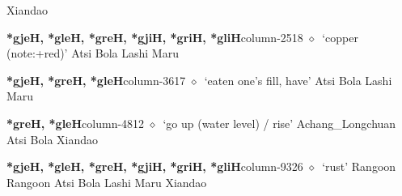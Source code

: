 \hspace{1ex}
         Xiandao 
  \item {\footnotesize \textbf{*gjeH, *gleH, *greH, *gjiH, *griH, *gliH}}{\tiny column-2518}
         $\diamond$~`copper (note:+red)'
         Atsi 
\hspace{1ex}
         Bola 
\hspace{1ex}
         Lashi 
\hspace{1ex}
         Maru 
  \item {\footnotesize \textbf{*gjeH, *greH, *gleH}}{\tiny column-3617}
         $\diamond$~`eaten one's fill, have'
         Atsi 
\hspace{1ex}
         Bola 
\hspace{1ex}
         Lashi 
\hspace{1ex}
         Maru 
  \item {\footnotesize \textbf{*greH, *gleH}}{\tiny column-4812}
         $\diamond$~`go up (water level) / rise'
         Achang\_Longchuan 
\hspace{1ex}
         Atsi 
\hspace{1ex}
         Bola 
\hspace{1ex}
         Xiandao 
  \item {\footnotesize \textbf{*gjeH, *gleH, *greH, *gjiH, *griH, *gliH}}{\tiny column-9326}
         $\diamond$~`rust'
         Rangoon 
\hspace{1ex}
         Rangoon 
\hspace{1ex}
         Atsi 
\hspace{1ex}
         Bola 
\hspace{1ex}
         Lashi 
\hspace{1ex}
         Maru 
\hspace{1ex}
         Xiandao 
